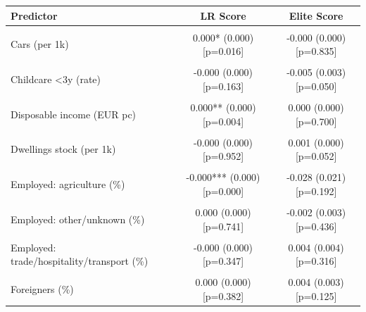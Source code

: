 \begin{table}[!h]
\centering
\begin{tabular}{lcc}
\toprule
Predictor & LR Score & Elite Score\\
\midrule
\cellcolor{gray!10}{Birth balance (‰)} & \cellcolor{gray!10}{-0.000 (0.000) [p=0.800]} & \cellcolor{gray!10}{-0.006 (0.006) [p=0.327]}\\
Cars (per 1k) & 0.000* (0.000) [p=0.016] & -0.000 (0.000) [p=0.835]\\
\cellcolor{gray!10}{Childcare 3–6y (rate)} & \cellcolor{gray!10}{0.000 (0.000) [p=0.951]} & \cellcolor{gray!10}{-0.007 (0.005) [p=0.168]}\\
Childcare <3y (rate) & -0.000 (0.000) [p=0.163] & -0.005 (0.003) [p=0.050]\\
\cellcolor{gray!10}{Craft firms (per 1k)} & \cellcolor{gray!10}{-0.000 (0.000) [p=0.207]} & \cellcolor{gray!10}{0.003 (0.012) [p=0.771]}\\
\addlinespace
Disposable income (EUR pc) & 0.000** (0.000) [p=0.004] & 0.000 (0.000) [p=0.700]\\
\cellcolor{gray!10}{Dwellings completed (per 1k)} & \cellcolor{gray!10}{0.000** (0.000) [p=0.002]} & \cellcolor{gray!10}{0.001 (0.009) [p=0.919]}\\
Dwellings stock (per 1k) & -0.000 (0.000) [p=0.952] & 0.001 (0.000) [p=0.052]\\
\cellcolor{gray!10}{EV/Hybrid cars (\%)} & \cellcolor{gray!10}{0.000 (0.000) [p=0.966]} & \cellcolor{gray!10}{0.030 (0.028) [p=0.275]}\\
Employed: agriculture (\%) & -0.000*** (0.000) [p=0.000] & -0.028 (0.021) [p=0.192]\\
\addlinespace
\cellcolor{gray!10}{Employed: manufacturing (\%)} & \cellcolor{gray!10}{-0.000* (0.000) [p=0.045]} & \cellcolor{gray!10}{-0.001 (0.002) [p=0.354]}\\
Employed: other/unknown (\%) & 0.000 (0.000) [p=0.741] & -0.002 (0.003) [p=0.436]\\
\cellcolor{gray!10}{Employed: services (\%)} & \cellcolor{gray!10}{-0.000** (0.000) [p=0.002]} & \cellcolor{gray!10}{0.002 (0.002) [p=0.238]}\\
Employed: trade/hospitality/transport (\%) & -0.000 (0.000) [p=0.347] & 0.004 (0.004) [p=0.316]\\
\cellcolor{gray!10}{Firms (per 1k)} & \cellcolor{gray!10}{-0.000 (0.000) [p=0.671]} & \cellcolor{gray!10}{0.002 (0.002) [p=0.541]}\\
\addlinespace
Foreigners (\%) & 0.000 (0.000) [p=0.382] & 0.004 (0.003) [p=0.125]\\

\end{tabular}
\end{table}
